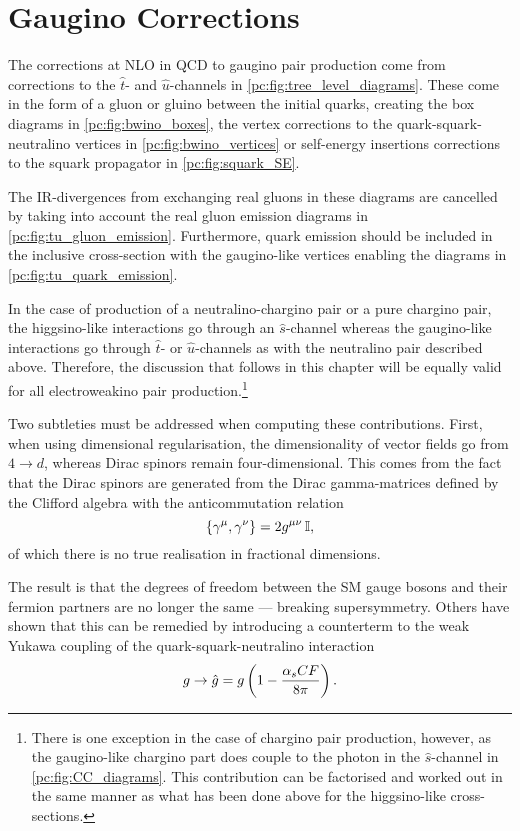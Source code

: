 \documentclass[../main.tex]{subfiles}
\begin{document}
\section{Gaugino Corrections}
The corrections at NLO in QCD to gaugino pair production come from corrections to the \(\hat{t}\)- and \(\hat{u}\)-channels in \cref{pc:fig:tree_level_diagrams}.
These come in the form of a gluon or gluino between the initial quarks, creating the box diagrams in \cref{pc:fig:bwino_boxes}, the vertex corrections to the quark-squark-neutralino vertices in \cref{pc:fig:bwino_vertices} or self-energy insertions corrections to the squark propagator in \cref{pc:fig:squark_SE}.

The IR-divergences from exchanging real gluons in these diagrams are cancelled by taking into account the real gluon emission diagrams in \cref{pc:fig:tu_gluon_emission}. Furthermore, quark emission should be included in the inclusive cross-section with the gaugino-like vertices enabling the diagrams in \cref{pc:fig:tu_quark_emission}.

In the case of production of a neutralino-chargino pair or a pure chargino pair, the higgsino-like interactions go through an \(\hat{s}\)-channel whereas the gaugino-like interactions go through \(\hat{t}\)- or \(\hat{u}\)-channels as with the neutralino pair described above.
Therefore, the discussion that follows in this chapter will be equally valid for all electroweakino pair production.\footnote{There is one exception in the case of chargino pair production, however, as the gaugino-like chargino part does couple to the photon in the \(\hat{s}\)-channel in \cref{pc:fig:CC_diagrams}. This contribution can be factorised and worked out in the same manner as what has been done above for the higgsino-like cross-sections.}
\medskip

Two subtleties must be addressed when computing these contributions.
First, when using dimensional regularisation, the dimensionality of vector fields go from \(4 \to d\), whereas Dirac spinors remain four-dimensional.
This comes from the fact that the Dirac spinors are generated from the Dirac gamma-matrices defined by the Clifford algebra with the anticommutation relation
\begin{equation}
  \cclosed{\gamma\^\mu, \gamma\^\nu} = 2\g \eye,
\end{equation}
of which there is no true realisation in fractional dimensions.

The result is that the degrees of freedom between the SM gauge bosons and their fermion partners are no longer the same --- breaking supersymmetry.
Others have shown that this can be remedied by introducing a counterterm to the weak Yukawa coupling of the quark-squark-neutralino interaction~\cite{Aguilar-Saavedra:2005zyz}
\begin{equation}
  g \to \hat{g} = g\left(1 - \frac{\alpha_s CF}{8\pi}\right).
\end{equation}
\end{document}
